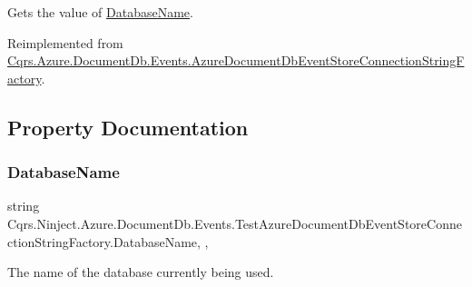 Gets the value of \hyperlink{classCqrs_1_1Ninject_1_1Azure_1_1DocumentDb_1_1Events_1_1TestAzureDocumentDbEventStoreConnectionStringFactory_ad82e2485313ff7802ad125958173f3bf_ad82e2485313ff7802ad125958173f3bf}{Database\+Name}. 



Reimplemented from \hyperlink{classCqrs_1_1Azure_1_1DocumentDb_1_1Events_1_1AzureDocumentDbEventStoreConnectionStringFactory_af243f79315140e1f2c20a5c1695f4fb9_af243f79315140e1f2c20a5c1695f4fb9}{Cqrs.\+Azure.\+Document\+Db.\+Events.\+Azure\+Document\+Db\+Event\+Store\+Connection\+String\+Factory}.



\subsection{Property Documentation}
\mbox{\label{classCqrs_1_1Ninject_1_1Azure_1_1DocumentDb_1_1Events_1_1TestAzureDocumentDbEventStoreConnectionStringFactory_ad82e2485313ff7802ad125958173f3bf_ad82e2485313ff7802ad125958173f3bf}} 
\subsubsection{\texorpdfstring{Database\+Name}{DatabaseName}}
{\footnotesize\ttfamily string Cqrs.\+Ninject.\+Azure.\+Document\+Db.\+Events.\+Test\+Azure\+Document\+Db\+Event\+Store\+Connection\+String\+Factory.\+Database\+Name\hspace{0.3cm}{\ttfamily [static]}, {\ttfamily [get]}, {\ttfamily [set]}}



The name of the database currently being used. 

